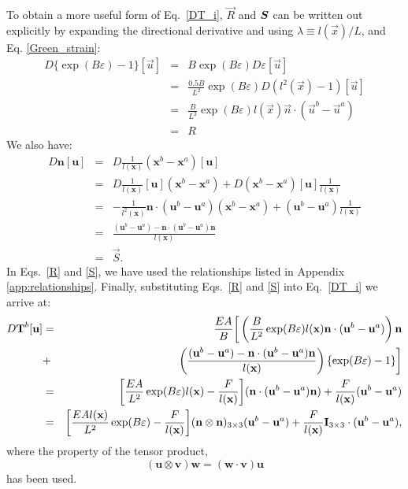 To obtain a more useful form of Eq.\ \eqref{DT_i}, $\vec{R}$ and $\bm{S}$ can be written out explicitly by expanding the directional derivative and using $\lambda \equiv l(\vec{x})/L$, and Eq. \eqref{Green_strain}: 
%
\begin{eqnarray}
D \{ \exp(B \varepsilon) - 1\} [\vec{u}] &=& B \exp(B \varepsilon) D \varepsilon [\vec{u}] \nonumber\\
&=& \frac{0.5B}{L^2} \exp(B \varepsilon) D( l^2(\vec{x}) - 1) [\vec{u}]\nonumber\\
&=& \frac{B}{L^2}\exp(B \varepsilon)   l(\vec{x})\vec{n} \cdot (\vec{u}^b - \vec{u}^a) \nonumber\\
&=& R
\label{R}
\end{eqnarray}
%
We also have:
%
\begin{eqnarray}
D \textbf{n} [\textbf{u}]  &=& D \frac{1}{l(\textbf{x})}(\textbf{x}^b - \textbf{x}^a) [\textbf{u}] \nonumber\\
&=& D \frac{1}{l(\textbf{x})} [\textbf{u}](\textbf{x}^b - \textbf{x}^a) + D (\textbf{x}^b - \textbf{x}^a) [\textbf{u}] \frac{1}{l(\textbf{x})} \nonumber\\
&=& -\frac{1}{l^{2}(\textbf{x})}\textbf{n} \cdot (\textbf{u}^b - \textbf{u}^a)(\textbf{x}^b - \textbf{x}^a) + (\textbf{u}^b - \textbf{u}^a)  \frac{1}{l(\textbf{x})} \nonumber\\
&=& \frac{(\textbf{u}^b - \textbf{u}^a)-\textbf{n} \cdot (\textbf{u}^b - \textbf{u}^a)\textbf{n}}{l(\textbf{x})} \nonumber\\
&=& \vec{S}.
\label{S}
\end{eqnarray}
%
In Eqs.\ \eqref{R} and \eqref{S}, we have used the relationships listed in Appendix \ref{app:relationships}. Finally, substituting Eqs.\ \eqref{R} and \eqref{S} into Eq.\ \eqref{DT_i} we arrive at:
%
\begin{eqnarray}
D\textbf{T}^b [\textbf{u}] &=& \frac{E A}{B} \bigg[ \left(\frac{B }{L^2} \exp(B \varepsilon) l(\textbf{x})\textbf{n} \cdot (\textbf{u}^b - \textbf{u}^a)\right)\textbf{n} \nonumber\\
&+& \left( \frac{(\textbf{u}^b - \textbf{u}^a)-\textbf{n} \cdot (\textbf{u}^b - \textbf{u}^a)\textbf{n}}{l(\textbf{x})} \right) \{ \exp(B \varepsilon) - 1 \} \bigg] \nonumber\\
&=& \bigg[ \frac{E A }{L^2} \exp(B \varepsilon)  l(\textbf{x})-\frac{F}{l(\textbf{x})} \bigg] (\textbf{n} \cdot (\textbf{u}^b - \textbf{u}^a)\textbf{n}) + \frac{F}{l(\textbf{x})}(\textbf{u}^b - \textbf{u}^a) \nonumber\\
&=& \bigg[ \frac{E A  l(\textbf{x})}{L^2} \exp(B \varepsilon) -\frac{F}{l(\textbf{x})} \bigg] (\textbf{n} \otimes \textbf{n})_{3\times3}(\textbf{u}^b - \textbf{u}^a) + \frac{F}{l(\textbf{x})} \text{\textbf{I}}_{3\times3} \cdot (\textbf{u}^b - \textbf{u}^a) , \nonumber\\
\label{DTi_final}
\end{eqnarray}
%
where the property of the tensor product,
%
\begin{equation}
(\textbf{u} \otimes \textbf{v})\textbf{w} = (\textbf{w} \cdot \textbf{v})\textbf{u}
\end{equation}
%
has been used.

